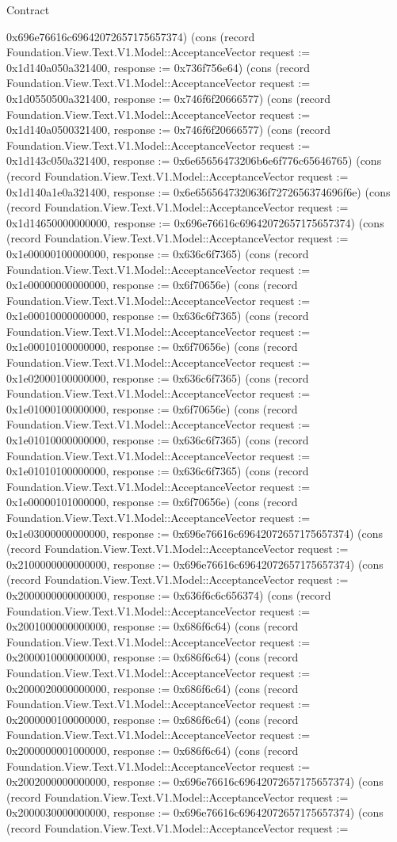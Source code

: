 \begin{lexlean}{Contract}
\begin{semanticmodule}
{0x696e76616c69642072657175657374}) (cons (record Foundation.View.Text.V1.Model::AcceptanceVector {request := 0x1d140a050a321400, response := 0x736f756e64}) (cons (record Foundation.View.Text.V1.Model::AcceptanceVector {request := 0x1d0550500a321400, response := 0x746f6f20666577}) (cons (record Foundation.View.Text.V1.Model::AcceptanceVector {request := 0x1d140a0500321400, response := 0x746f6f20666577}) (cons (record Foundation.View.Text.V1.Model::AcceptanceVector {request := 0x1d143c050a321400, response := 0x6e65656473206b6e6f776c65646765}) (cons (record Foundation.View.Text.V1.Model::AcceptanceVector {request := 0x1d140a1e0a321400, response := 0x6e6565647320636f7272656374696f6e}) (cons (record Foundation.View.Text.V1.Model::AcceptanceVector {request := 0x1d14650000000000, response := 0x696e76616c69642072657175657374}) (cons (record Foundation.View.Text.V1.Model::AcceptanceVector {request := 0x1e00000100000000, response := 0x636c6f7365}) (cons (record Foundation.View.Text.V1.Model::AcceptanceVector {request := 0x1e00000000000000, response := 0x6f70656e}) (cons (record Foundation.View.Text.V1.Model::AcceptanceVector {request := 0x1e00010000000000, response := 0x636c6f7365}) (cons (record Foundation.View.Text.V1.Model::AcceptanceVector {request := 0x1e00010100000000, response := 0x6f70656e}) (cons (record Foundation.View.Text.V1.Model::AcceptanceVector {request := 0x1e02000100000000, response := 0x636c6f7365}) (cons (record Foundation.View.Text.V1.Model::AcceptanceVector {request := 0x1e01000100000000, response := 0x6f70656e}) (cons (record Foundation.View.Text.V1.Model::AcceptanceVector {request := 0x1e01010000000000, response := 0x636c6f7365}) (cons (record Foundation.View.Text.V1.Model::AcceptanceVector {request := 0x1e01010100000000, response := 0x636c6f7365}) (cons (record Foundation.View.Text.V1.Model::AcceptanceVector {request := 0x1e00000101000000, response := 0x6f70656e}) (cons (record Foundation.View.Text.V1.Model::AcceptanceVector {request := 0x1e03000000000000, response := 0x696e76616c69642072657175657374}) (cons (record Foundation.View.Text.V1.Model::AcceptanceVector {request := 0x2100000000000000, response := 0x696e76616c69642072657175657374}) (cons (record Foundation.View.Text.V1.Model::AcceptanceVector {request := 0x2000000000000000, response := 0x636f6c6c656374}) (cons (record Foundation.View.Text.V1.Model::AcceptanceVector {request := 0x2001000000000000, response := 0x686f6c64}) (cons (record Foundation.View.Text.V1.Model::AcceptanceVector {request := 0x2000010000000000, response := 0x686f6c64}) (cons (record Foundation.View.Text.V1.Model::AcceptanceVector {request := 0x2000020000000000, response := 0x686f6c64}) (cons (record Foundation.View.Text.V1.Model::AcceptanceVector {request := 0x2000000100000000, response := 0x686f6c64}) (cons (record Foundation.View.Text.V1.Model::AcceptanceVector {request := 0x2000000001000000, response := 0x686f6c64}) (cons (record Foundation.View.Text.V1.Model::AcceptanceVector {request := 0x2002000000000000, response := 0x696e76616c69642072657175657374}) (cons (record Foundation.View.Text.V1.Model::AcceptanceVector {request := 0x2000030000000000, response := 0x696e76616c69642072657175657374}) (cons (record Foundation.View.Text.V1.Model::AcceptanceVector {request := }
\end{semanticmodule}
\end{lexlean}
